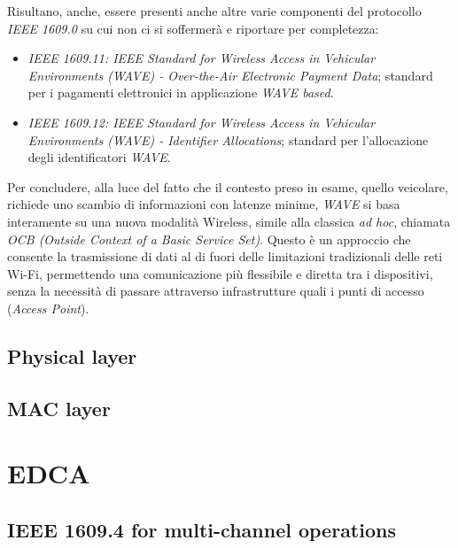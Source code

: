 Risultano, anche, essere presenti anche altre varie componenti del protocollo \textit{IEEE 1609.0} su cui non ci si soffermerà e riportare per completezza:

\begin{itemize}
    \item \textit{IEEE 1609.11:  IEEE Standard for Wireless Access in Vehicular Environments (WAVE) - Over-the-Air Electronic Payment Data}; standard per i pagamenti elettronici in applicazione \textit{WAVE based}.
    \item \textit{IEEE 1609.12:  IEEE Standard for Wireless Access in Vehicular Environments (WAVE) - Identifier Allocations}; standard per l'allocazione degli identificatori \textit{WAVE}.
\end{itemize}

Per concludere, alla luce del fatto che il contesto preso in esame, quello veicolare, richiede uno scambio di informazioni con latenze minime, \textit{WAVE} si basa interamente su una nuova modalità Wireless, simile alla classica \textit{ad hoc}, chiamata \textit{OCB (Outside Context of a Basic Service Set)}. Questo è un approccio che consente la trasmissione di dati al di fuori delle limitazioni tradizionali delle reti Wi-Fi, permettendo una comunicazione più flessibile e diretta tra i dispositivi, senza la necessità di passare attraverso infrastrutture quali i punti di accesso (\textit{Access Point}).

\subsection[Physical layer]{Physical layer}

\subsection[MAC layer]{MAC layer}

\section[EDCA]{EDCA}

\subsection[IEEE 1609.4 for multi-channel operations]{IEEE 1609.4 for multi-channel operations}